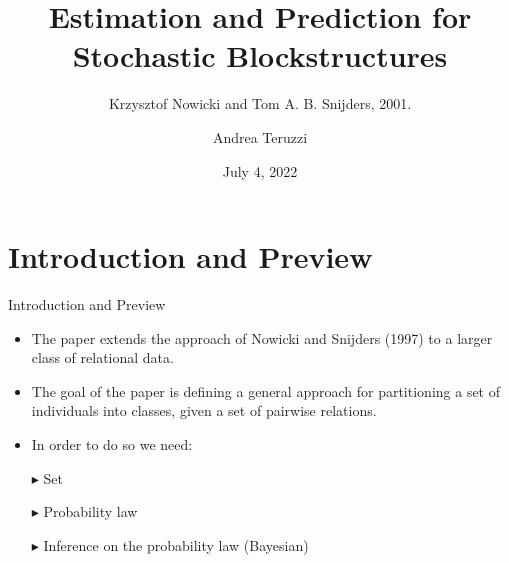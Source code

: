 \documentclass[aspectratio=169,xcolor=dvipsnames]{beamer}
\title[Nowicki and Snijders '01]{Estimation and Prediction for Stochastic Blockstructures} \subtitle{Krzysztof Nowicki and Tom A. B. Snijders, 2001.}
\author[andrea.teruzzi@proton.me] {Andrea Teruzzi}
\date[VSI – BayesLab]{July 4, 2022}
\begin{document}
\begin{frame}
    \titlepage
\end{frame}



\section{Introduction and Preview}
\begin{frame}{Introduction and Preview}
\begin{itemize}
    \item The paper extends the approach of Nowicki and Snijders (1997) to a larger class of relational data.
    
    \item The goal of the paper is defining a general approach for partitioning a set of individuals into classes, given a set of pairwise relations.
    
    \item In order to do so we need:
        
        \addtolength{\itemindent}{12pt}
        
        \item[$\blacktriangleright$] Set
        
        \item[$\blacktriangleright$] Probability law
        
        \item[$\blacktriangleright$] Inference on the probability law (Bayesian)
\end{itemize}
\end{frame}

\end{document}
